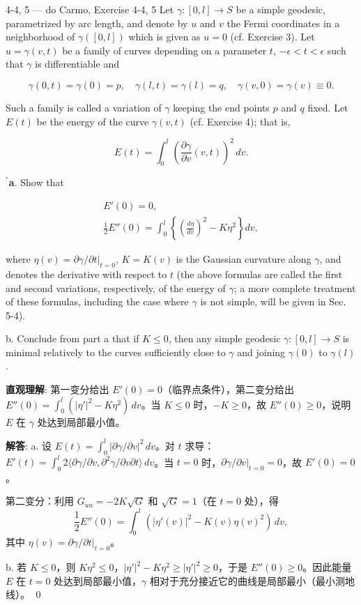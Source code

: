 \begin{exercise}{4-4, 5 — do Carmo, Exercise 4-4, 5}
Let $\gamma \colon [0,l] \to S$ be a simple geodesic, parametrized by arc length, and denote by $u$ and $v$ the Fermi coordinates in a neighborhood of $\gamma([0,l])$ which is given as $u = 0$ (cf. Exercise 3). Let $u = \gamma(v,t)$ be a family of curves depending on a parameter $t$, $-\epsilon < t < \epsilon$ such that $\gamma$ is differentiable and

\[
\gamma(0, t) = \gamma(0) = p, \quad \gamma(l, t) = \gamma(l) = q, \quad \gamma(v, 0) = \gamma(v) \equiv 0.
\]

Such a family is called a variation of $\gamma$ keeping the end points $p$ and $q$ fixed. Let $E(t)$ be the energy of the curve $\gamma(v, t)$ (cf. Exercise 4); that is,

\[
E(t) = \int_0^l \left(\frac{\partial \gamma}{\partial v}(v, t)\right)^2 \, dv.
\]

$^{^*}$\textbf{a}. Show that

\[
\begin{array}{l}
E'(0) = 0, \\[4pt]
\frac{1}{2} E''(0) = \int_0^l \left\{\left(\frac{d\eta}{dv}\right)^2 - K\eta^2\right\} dv,
\end{array}
\]

where $\eta(v) = \partial\gamma/\partial t|_{t=0}$, $K = K(v)$ is the Gaussian curvature along $\gamma$, and denotes the derivative with respect to $t$ (the above formulas are called the first and second variations, respectively, of the energy of $\gamma$; a more complete treatment of these formulas, including the case where $\gamma$ is not simple, will be given in Sec. 5-4).

b. Conclude from part a that if $K \leq 0$, then any simple geodesic $\gamma \colon [0, l] \to S$ is minimal relatively to the curves sufficiently close to $\gamma$ and joining $\gamma(0)$ to $\gamma(l)$.
\end{exercise}

\begin{solution}
\textbf{直观理解}: 第一变分给出 $E'(0)=0$（临界点条件），第二变分给出 $E''(0) = \int_0^l(|\eta'|^2 - K\eta^2)\,dv$。当 $K\leq 0$ 时，$-K\geq 0$，故 $E''(0)\geq 0$，说明 $E$ 在 $\gamma$ 处达到局部最小值。

\textbf{解答}: a. 设 $E(t) = \int_0^l |\partial\gamma/\partial v|^2\,dv$。对 $t$ 求导：$E'(t) = \int_0^l 2\langle\partial\gamma/\partial v,\partial^2\gamma/\partial v\partial t\rangle\,dv$。当 $t=0$ 时，$\partial\gamma/\partial v|_{t=0} = 0$，故 $E'(0)=0$。

第二变分：利用 $G_{uu} = -2K\sqrt{G}$ 和 $\sqrt{G}=1$（在 $t=0$ 处），得
\[
\frac{1}{2}E''(0) = \int_0^l\left(|\eta'(v)|^2 - K(v)\eta(v)^2\right)\,dv,
\]
其中 $\eta(v) = \partial\gamma/\partial t|_{t=0}$。

b. 若 $K\leq 0$，则 $K\eta^2\leq 0$，$|\eta'|^2 - K\eta^2 \geq |\eta'|^2 \geq 0$，于是 $E''(0) \geq 0$。因此能量 $E$ 在 $t=0$ 处达到局部最小值，$\gamma$ 相对于充分接近它的曲线是局部最小（最小测地线）。
\qed
\end{solution}

